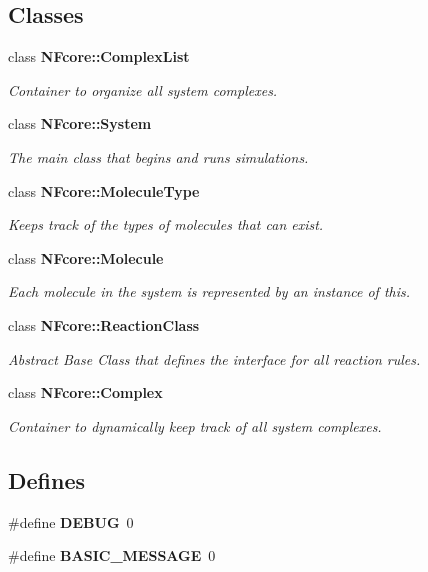 \subsection*{Classes}
\begin{CompactItemize}
\item 
class {\bf NFcore::ComplexList}
\begin{CompactList}\small\item\em Container to organize all system complexes. \item\end{CompactList}\item 
class {\bf NFcore::System}
\begin{CompactList}\small\item\em The main class that begins and runs simulations. \item\end{CompactList}\item 
class {\bf NFcore::MoleculeType}
\begin{CompactList}\small\item\em Keeps track of the types of molecules that can exist. \item\end{CompactList}\item 
class {\bf NFcore::Molecule}
\begin{CompactList}\small\item\em Each molecule in the system is represented by an instance of this. \item\end{CompactList}\item 
class {\bf NFcore::ReactionClass}
\begin{CompactList}\small\item\em Abstract Base Class that defines the interface for all reaction rules. \item\end{CompactList}\item 
class {\bf NFcore::Complex}
\begin{CompactList}\small\item\em Container to dynamically keep track of all system complexes. \item\end{CompactList}\end{CompactItemize}
\subsection*{Defines}
\begin{CompactItemize}
\item 
\#define {\bf DEBUG}~0
\item 
\#define {\bf BASIC\_\-MESSAGE}~0
\end{CompactItemize}


